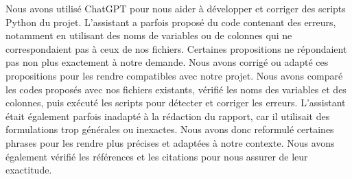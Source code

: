 Nous avons utilisé ChatGPT pour nous aider à développer et corriger des scripts Python du projet. L'assistant a parfois proposé du code contenant des erreurs, notamment en utilisant des noms de variables ou de colonnes qui ne correspondaient pas à ceux de nos fichiers. Certaines propositions ne répondaient pas non plus exactement à notre demande. Nous avons corrigé ou adapté ces propositions pour les rendre compatibles avec notre projet. Nous avons comparé les codes proposés avec nos fichiers existants, vérifié les noms des variables et des colonnes, puis exécuté les scripts pour détecter et corriger les erreurs. L'assistant était également parfois inadapté à la rédaction du rapport, car il utilisait des formulations trop générales ou inexactes. Nous avons donc reformulé certaines phrases pour les rendre plus précises et adaptées à notre contexte. Nous avons également vérifié les références et les citations pour nous assurer de leur exactitude.

